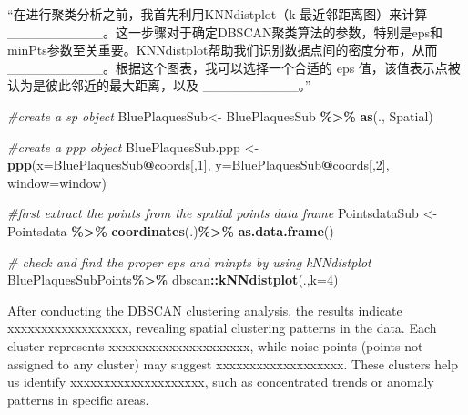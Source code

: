 \documentclass[
]{article}
\newenvironment{Shaded}{\begin{snugshade}}{\end{snugshade}}
\newcommand{\AttributeTok}[1]{\textcolor[rgb]{0.13,0.29,0.53}{#1}}
\newcommand{\CommentTok}[1]{\textcolor[rgb]{0.56,0.35,0.01}{\textit{#1}}}
\newcommand{\DecValTok}[1]{\textcolor[rgb]{0.00,0.00,0.81}{#1}}
\newcommand{\FunctionTok}[1]{\textcolor[rgb]{0.13,0.29,0.53}{\textbf{#1}}}
\newcommand{\NormalTok}[1]{#1}
\newcommand{\OtherTok}[1]{\textcolor[rgb]{0.56,0.35,0.01}{#1}}
\newcommand{\SpecialCharTok}[1]{\textcolor[rgb]{0.81,0.36,0.00}{\textbf{#1}}}
\newcommand{\StringTok}[1]{\textcolor[rgb]{0.31,0.60,0.02}{#1}}
\begin{document}
``在进行聚类分析之前，我首先利用KNNdistplot（k-最近邻距离图）来计算
\_\_\_\_\_\_\_\_\_\_。这一步骤对于确定DBSCAN聚类算法的参数，特别是eps和minPts参数至关重要。KNNdistplot帮助我们识别数据点间的密度分布，从而
\_\_\_\_\_\_\_\_\_\_。根据这个图表，我可以选择一个合适的 eps
值，该值表示点被认为是彼此邻近的最大距离，以及 \_\_\_\_\_\_\_\_\_\_。''

\begin{Shaded}
\begin{Highlighting}[]
\CommentTok{\#create a sp object}
\NormalTok{BluePlaquesSub}\OtherTok{\textless{}{-}}\NormalTok{ BluePlaquesSub }\SpecialCharTok{\%\textgreater{}\%}
  \FunctionTok{as}\NormalTok{(., }\StringTok{\textquotesingle{}Spatial\textquotesingle{}}\NormalTok{)}

\CommentTok{\#create a ppp object}
\NormalTok{BluePlaquesSub.ppp }\OtherTok{\textless{}{-}} \FunctionTok{ppp}\NormalTok{(}\AttributeTok{x=}\NormalTok{BluePlaquesSub}\SpecialCharTok{@}\NormalTok{coords[,}\DecValTok{1}\NormalTok{],}
                          \AttributeTok{y=}\NormalTok{BluePlaquesSub}\SpecialCharTok{@}\NormalTok{coords[,}\DecValTok{2}\NormalTok{],}
                          \AttributeTok{window=}\NormalTok{window)}

\CommentTok{\#first extract the points from the spatial points data frame}
\NormalTok{PointsdataSub }\OtherTok{\textless{}{-}}\NormalTok{ Pointsdata }\SpecialCharTok{\%\textgreater{}\%}
  \FunctionTok{coordinates}\NormalTok{(.)}\SpecialCharTok{\%\textgreater{}\%}
  \FunctionTok{as.data.frame}\NormalTok{()}

\CommentTok{\# check and find the proper eps and minpts by using kNNdistplot}
\NormalTok{BluePlaquesSubPoints}\SpecialCharTok{\%\textgreater{}\%}
\NormalTok{  dbscan}\SpecialCharTok{::}\FunctionTok{kNNdistplot}\NormalTok{(.,}\AttributeTok{k=}\DecValTok{4}\NormalTok{)}
\end{Highlighting}
\end{Shaded}

After conducting the DBSCAN clustering analysis, the results indicate
xxxxxxxxxxxxxxxxxx, revealing spatial clustering patterns in the data.
Each cluster represents xxxxxxxxxxxxxxxxxxxxx, while noise points
(points not assigned to any cluster) may suggest xxxxxxxxxxxxxxxxxxx.
These clusters help us identify xxxxxxxxxxxxxxxxxxxx, such as
concentrated trends or anomaly patterns in specific areas.
\end{document}
